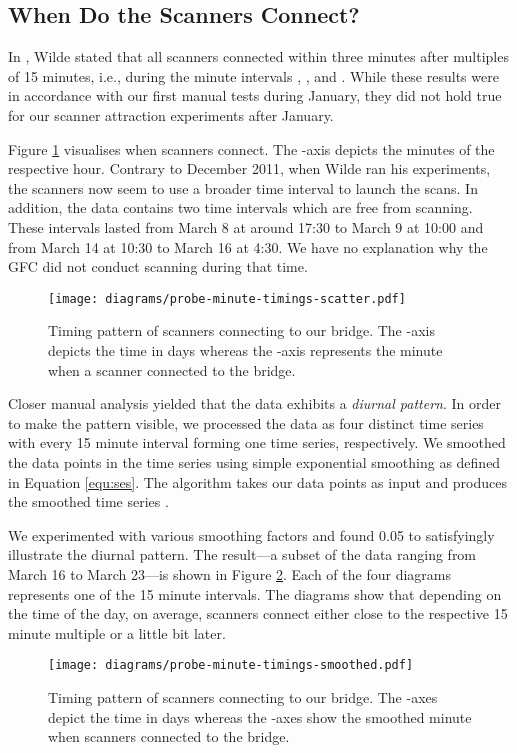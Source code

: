 \documentclass[runningheads,a4paper]{llncs}
\begin{document}
\subsection{When Do the Scanners Connect?}
In \cite{twilde}, Wilde stated that all scanners connected within three minutes after multiples of
15 minutes, i.e., during the minute intervals , ,  and . While
these results were in accordance with our first manual tests during January, they did not hold true
for our scanner attraction experiments after January.

Figure \ref{fig:timing} visualises when scanners connect. The -axis depicts the minutes of the
respective hour. Contrary to December 2011, when Wilde ran his experiments, the scanners now seem to
use a broader time interval to launch the scans. In addition, the data contains two time intervals
which are free from scanning. These intervals lasted from March 8 at around 17:30 to March 9 at
10:00 and from March 14 at 10:30 to March 16 at 4:30. We have no explanation why the GFC did not
conduct scanning during that time.

\begin{figure}
\centering
\texttt{[image: diagrams/probe-minute-timings-scatter.pdf]}
\caption{Timing pattern of scanners connecting to our bridge. The -axis depicts the time in days
whereas the -axis represents the minute when a scanner connected to the bridge.}
\label{fig:timing}
\end{figure}

Closer manual analysis yielded that the data exhibits a \emph{diurnal pattern}. In order to make the
pattern visible, we processed the data as four distinct time series with every 15 minute interval
forming one time series, respectively. We smoothed the data points in the time series using simple
exponential smoothing as defined in Equation \ref{equ:ses}. The algorithm takes our data points 
as input and produces the smoothed time series .



We experimented with various smoothing factors  and found 0.05 to satisfyingly
illustrate the diurnal pattern. The result---a subset of the data ranging from March 16 to March
23---is shown in Figure \ref{fig:diurnal}. Each of the four diagrams represents one of the 15 minute
intervals. The diagrams show that depending on the time of the day, on average, scanners connect
either close to the respective 15 minute multiple or a little bit later.

\begin{figure}
\centering
\texttt{[image: diagrams/probe-minute-timings-smoothed.pdf]}
\caption{Timing pattern of scanners connecting to our bridge. The -axes depict the time in days
whereas the -axes show the smoothed minute when scanners connected to the bridge.}
\label{fig:diurnal}
\end{figure}
\end{document}
